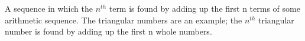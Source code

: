 A sequence in which the $n^{th}$  term is found by adding
up the first n terms of some arithmetic sequence. The triangular
numbers are an example; the $n^{th}$  triangular number is
found by adding up the first n whole numbers.